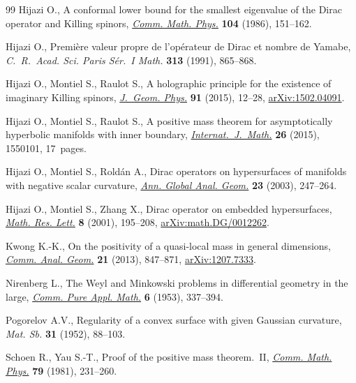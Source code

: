 \documentclass[10pt,a4paper]{amsart}
\numberwithin{equation}{section}
\begin{document}
\begin{thebibliography}{99}
Hijazi O., A conformal lower bound for the smallest eigenvalue of the {D}irac
 operator and {K}illing spinors, \href{https://doi.org/10.1007/BF01210797}{\textit{Comm. Math. Phys.}} \textbf{104}
 (1986), 151--162.

Hijazi O., Premi\`ere valeur propre de l'op\'erateur de {D}irac et nombre de
 {Y}amabe, \textit{C.~R.~Acad. Sci. Paris S\'er.~I Math.} \textbf{313} (1991),
 865--868.

Hijazi O., Montiel S., Raulot S., A holographic principle for the existence of
 imaginary {K}illing spinors, \href{https://doi.org/10.1016/j.geomphys.2015.01.012}{\textit{J.~Geom. Phys.}} \textbf{91} (2015),
 12--28, \href{https://arxiv.org/abs/1502.04091}{arXiv:1502.04091}.

Hijazi O., Montiel S., Raulot S., A positive mass theorem for asymptotically
 hyperbolic manifolds with inner boundary, \href{https://doi.org/10.1142/S0129167X15501013}{\textit{Internat.~J.~Math.}}
 \textbf{26} (2015), 1550101, 17~pages.

Hijazi O., Montiel S., Rold\'an A., Dirac operators on hypersurfaces of
 manifolds with negative scalar curvature, \href{https://doi.org/10.1023/A:1022808916165}{\textit{Ann. Global Anal. Geom.}}
 \textbf{23} (2003), 247--264.

Hijazi O., Montiel S., Zhang X., Dirac operator on embedded hypersurfaces,
 \href{https://doi.org/10.4310/MRL.2001.v8.n2.a8}{\textit{Math. Res. Lett.}} \textbf{8} (2001), 195--208,
 \href{https://arxiv.org/abs/math.DG/0012262}{arXiv:math.DG/0012262}.

Kwong K.-K., On the positivity of a quasi-local mass in general dimensions,
 \href{https://doi.org/10.4310/CAG.2013.v21.n4.a3}{\textit{Comm. Anal. Geom.}} \textbf{21} (2013), 847--871, \href{https://arxiv.org/abs/1207.7333}{arXiv:1207.7333}.

Nirenberg L., The {W}eyl and {M}inkowski problems in differential geometry in
 the large, \href{https://doi.org/10.1002/cpa.3160060303}{\textit{Comm. Pure Appl. Math.}} \textbf{6} (1953), 337--394.

Pogorelov A.V., Regularity of a convex surface with given {G}aussian curvature,
 \textit{Mat. Sb.} \textbf{31} (1952), 88--103.

Schoen R., Yau S.-T., Proof of the positive mass theorem.~{II}, \href{https://doi.org/10.1007/BF01942062}{\textit{Comm.
 Math. Phys.}} \textbf{79} (1981), 231--260.


\end{thebibliography}
\end{document}
